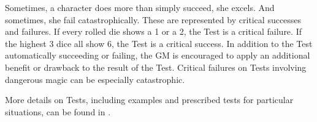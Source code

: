Sometimes, a character does more than simply succeed, she excels.
And sometimes, she fail catastrophically.
These are represented by critical successes and failures.
If every rolled die shows a 1 or a 2, the Test is a critical failure.
If the highest 3 dice all show 6, the Test is a critical success.
In addition to the Test automatically succeeding or failing, the GM is encouraged to apply an additional benefit or drawback to the result of the Test.
Critical failures on Tests involving dangerous magic can be especially catastrophic.

More details on Tests, including examples and prescribed tests for particular situations, can be found in . %
